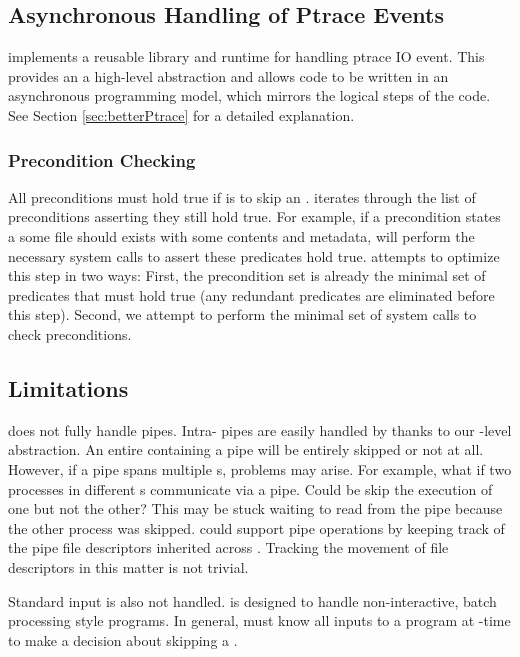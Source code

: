 \subsection{Asynchronous Handling of Ptrace Events}
\pc implements a reusable library and runtime for handling ptrace IO event. This provides an a high-level abstraction and allows code to be written in an asynchronous programming model, which mirrors the logical steps of the code. See Section \ref{sec:betterPtrace} for a detailed explanation.

\subsubsection{Precondition Checking}
\label{sec:precondition-checking}
All preconditions must hold true if \pc is to skip an \cacheunit{}. \pc iterates through the list of preconditions asserting they still hold true. For example, if a precondition states a some file  should exists with some contents and metadata, \pc will perform the necessary system calls to assert these predicates hold true. \pc attempts to optimize this step in two ways: First, the precondition set is already the minimal set of predicates that must hold true (any redundant predicates are eliminated before this step). Second, we attempt to perform the minimal set of system calls to check preconditions.

\subsection{Limitations} \label{sec:limitations}
\pc does not fully handle pipes. Intra-\cacheunit{} pipes are easily handled by \pc thanks to our \cacheunit{}-level abstraction. An entire \cacheunit{} containing a pipe will be entirely skipped or not at all. However, if a pipe spans multiple \cacheunit{}s,  problems may arise. For example, what if two processes in different \cacheunit{}s communicate via a pipe. Could be skip the execution of one \cacheunit but not the other? This \cacheunit{} may be stuck waiting to read from the pipe because the other process was skipped. \pc could support pipe operations by keeping track of the pipe file descriptors inherited across . Tracking the movement of file descriptors in this matter is not trivial.

Standard input is also not handled. \pc is designed to handle non-interactive, batch processing style programs. In general, \pc must know all inputs to a program at -time to make a decision about skipping a \cacheunit{}.

